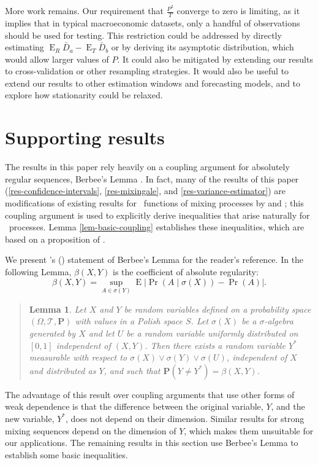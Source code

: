 \documentclass[11pt]{article}
\newtheorem{lem}[thm]{Lemma}
\DeclareMathOperator{\E}{E}
\newcommand{\oosA}{\bar{D}_a}
\newcommand{\oosB}{\bar{D}_b}
\begin{document}
More work remains.  Our requirement that $\frac{P^2}{T}$ converge to
zero is limiting, as it implies that in typical macroeconomic
datasets, only a handful of observations should be used for testing.
This restriction could be addressed by directly estimating $\E_R \oosA
- \E_T \oosB$ or by deriving its asymptotic distribution, which would
allow larger values of $P$.  It could also be mitigated by extending
our results to cross-validation or other resampling strategies.  It
would also be useful to extend our results to other estimation windows
and forecasting models, and to explore how stationarity could be
relaxed.

\appendix
\section{Supporting results}
The results in this paper rely heavily on a coupling argument for
absolutely regular sequences, Berbee's Lemma \citep{Ber:79}.  In fact,
many of the results of this paper (\ref{res-confidence-intervals},
\ref{res-mixingale}, and \ref{res-variance-estimator}) are
modifications of existing results for \ned\ functions of mixing
processes by \citet{Dej:97} and
\citet{DeD:00}; this coupling argument is used to
explicitly derive inequalities that arise naturally for \ned\
processes.  Lemma \ref{lem-basic-coupling} establishes these
inequalities, which are based on a proposition of
\citet{MeP:02}.

We present \citeauthor{MeP:02}'s
(\citeyear{MeP:02}) statement of Berbee's Lemma for
the reader's reference.  In the following Lemma, $\beta(X,Y)$ is the
coefficient of absolute regularity:
\[
\beta(X,Y) = \sup_{A \in \sigma(Y)} \E \lvert \Pr(A \mid \sigma(X))
  - \Pr(A) \rvert.
\]
\begin{quotation}
\begin{lem}\label{lem-berbee}
  Let $X$ and $Y$ be random variables defined on a probability space
  $(\Omega, \mathcal{T}, \mathbf{P})$ with values in a Polish space
  $S$.  Let $\sigma(X)$ be a $\sigma$-algebra generated by $X$ and let
  $U$ be a random variable uniformly distributed on $[0,1]$
  independent of $(X,Y)$.  Then there exists a random variable $Y^{*}$
  measurable with respect to $\sigma(X) \vee \sigma(Y) \vee
  \sigma(U)$, independent of $X$ and distributed as $Y$, and such that
  $\mathbf{P}(Y \neq Y^{*}) = \beta(X,Y)$.
\end{lem}
\noindent\citep{MeP:02}
\end{quotation}

The advantage of this result over coupling arguments that use other
forms of weak dependence is that the difference between the original
variable, $Y$, and the new variable, $Y^{*}$, does not depend on their
dimension.  Similar results for strong mixing sequences depend on the
dimension of $Y$, which makes them unsuitable for our applications.
The remaining results in this section use Berbee's Lemma to establish
some basic inequalities.
\end{document}
